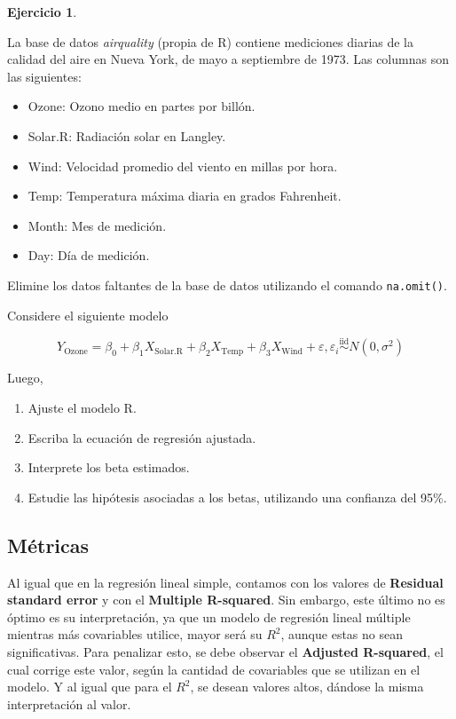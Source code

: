 \documentclass[
  11pt,
]{book}
\providecommand{\tightlist}{%
  \setlength{\itemsep}{0pt}\setlength{\parskip}{0pt}}
\theoremstyle{definition}
\theoremstyle{definition}
\theoremstyle{definition}
\newtheorem{exercise}{Ejercicio}[chapter]
\theoremstyle{definition}
\theoremstyle{remark}
\begin{document}
\begin{exercise}
\protect\hypertarget{exr:calidad-aire}{}\label{exr:calidad-aire}

La base de datos \emph{airquality} (propia de R) contiene mediciones diarias de la calidad del aire en Nueva York, de mayo a septiembre de 1973. Las columnas son las siguientes:

\begin{itemize}
\tightlist
\item
  Ozone: Ozono medio en partes por billón.
\item
  Solar.R: Radiación solar en Langley.
\item
  Wind: Velocidad promedio del viento en millas por hora.
\item
  Temp: Temperatura máxima diaria en grados Fahrenheit.
\item
  Month: Mes de medición.
\item
  Day: Día de medición.
\end{itemize}

Elimine los datos faltantes de la base de datos utilizando el comando \texttt{na.omit()}.

Considere el siguiente modelo

\[
Y_{\text{Ozone}} = \beta_0 + \beta_1X_{\text{Solar.R}} + \beta_2X_{\text{Temp}} + \beta_3X_{\text{Wind}} + \varepsilon, \varepsilon_i \overset{\text{iid}}{\sim} N(0,\sigma^2)
\]

Luego,

\begin{enumerate}
\def\labelenumi{\arabic{enumi}.}
\tightlist
\item
  Ajuste el modelo R.
\item
  Escriba la ecuación de regresión ajustada.
\item
  Interprete los beta estimados.
\item
  Estudie las hipótesis asociadas a los betas, utilizando una confianza del 95\%.
\end{enumerate}

\end{exercise}

\subsection{Métricas}\label{metricasRLM}

Al igual que en la regresión lineal simple, contamos con los valores de \textbf{Residual standard error} y con el \textbf{Multiple R-squared}. Sin embargo, este último no es óptimo es su interpretación, ya que un modelo de regresión lineal múltiple mientras más covariables utilice, mayor será su \(R^2\), aunque estas no sean significativas. Para penalizar esto, se debe observar el \textbf{Adjusted R-squared}, el cual corrige este valor, según la cantidad de covariables que se utilizan en el modelo. Y al igual que para el \(R^2\), se desean valores altos, dándose la misma interpretación al valor.
\end{document}
